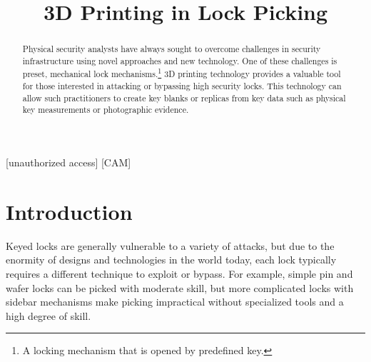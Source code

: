 \documentclass{acm_proc_article-sp}
\title{3D Printing in Lock Picking}
\begin{document}
\maketitle

\begin{abstract}
    Physical security analysts have always sought to overcome challenges in security infrastructure using novel approaches and new technology. One of these challenges is preset, mechanical lock mechanisms.\footnote{A locking mechanism that is opened by predefined key.}
    3D printing technology provides a valuable tool for those interested in attacking or bypassing high security locks. This technology can allow such practitioners to create key blanks or replicas from key data such as physical key measurements or photographic evidence.
\end{abstract}

[unauthorized access] 
[CAM]


\section{Introduction}
Keyed locks are generally vulnerable to a variety of attacks, but due to the enormity of designs and technologies in the world today, each lock typically requires a different technique to exploit or bypass. For example, simple pin and wafer locks can be picked with moderate skill, but more complicated locks with sidebar mechanisms make picking impractical without specialized tools and a high degree of skill.
\end{document}
